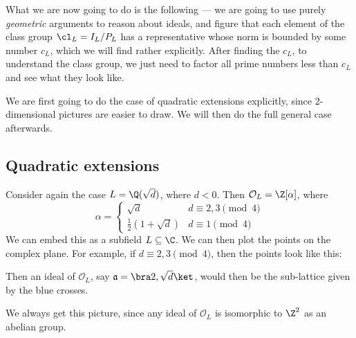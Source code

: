 \documentclass[a4paper]{article}
\begin{document}
What we are now going to do is the following --- we are going to use purely \emph{geometric} arguments to reason about ideals, and figure that each element of the class group $\cl_L = I_L/P_L$ has a representative whose norm is bounded by some number $c_L$, which we will find rather explicitly. After finding the $c_L$, to understand the class group, we just need to factor all prime numbers less than $c_L$ and see what they look like.

We are first going to do the case of quadratic extensions explicitly, since 2-dimensional pictures are easier to draw. We will then do the full general case afterwards.

\subsection*{Quadratic extensions}
Consider again the case $L = \Q(\sqrt{d})$, where $d < 0$. Then $\mathcal{O}_L = \Z[\alpha]$, where
\[
  \alpha =
  \begin{cases}
    \sqrt{d} & d \equiv 2, 3\pmod 4\\
    \frac{1}{2}(1 + \sqrt{d})& d \equiv 1 \pmod 4
  \end{cases}
\]
We can embed this as a subfield $L \subseteq \C$. We can then plot the points on the complex plane. For example, if $d \equiv 2, 3 \pmod 4$, then the points look like this:
\begin{center}
\end{center}
Then an ideal of $\mathcal{O}_L$, say $\mathfrak{a} = \bra 2, \sqrt{d}\ket$, would then be the sub-lattice given by the blue crosses.
\begin{center}
\end{center}
We always get this picture, since any ideal of $\mathcal{O}_L$ is isomorphic to $\Z^2$ as an abelian group.
\end{document}
